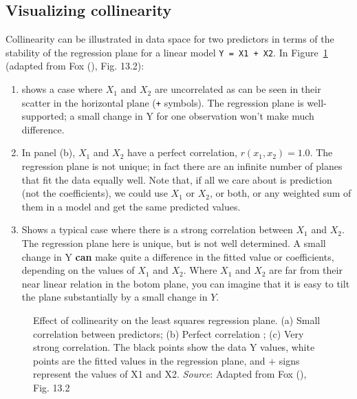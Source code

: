 \documentclass[
  letterpaper,
  10pt,
  krantz2]{krantz}
\begin{document}
\subsection{Visualizing collinearity}\label{visualizing-collinearity}

Collinearity can be illustrated in data space for two predictors in
terms of the stability of the regression plane for a linear model
\texttt{Y\ =\ X1\ +\ X2}. In Figure~\ref{fig-collin-demo} (adapted from
Fox (), Fig. 13.2):

\begin{enumerate}
\def\labelenumi{(\alph{enumi})}
\item
  shows a case where \(X_1\) and \(X_2\) are uncorrelated as can be seen
  in their scatter in the horizontal plane (\texttt{+} symbols). The
  regression plane is well-supported; a small change in Y for one
  observation won't make much difference.
\item
  In panel (b), \(X_1\) and \(X_2\) have a perfect correlation,
  \(r (x_1, x_2) = 1.0\). The regression plane is not unique; in fact
  there are an infinite number of planes that fit the data equally well.
  Note that, if all we care about is prediction (not the coefficients),
  we could use \(X_1\) or \(X_2\), or both, or any weighted sum of them
  in a model and get the same predicted values.
\item
  Shows a typical case where there is a strong correlation between
  \(X_1\) and \(X_2\). The regression plane here is unique, but is not
  well determined. A small change in Y \textbf{can} make quite a
  difference in the fitted value or coefficients, depending on the
  values of \(X_1\) and \(X_2\). Where \(X_1\) and \(X_2\) are far from
  their near linear relation in the botom plane, you can imagine that it
  is easy to tilt the plane substantially by a small change in \(Y\).
\end{enumerate}

\begin{figure}


\caption{\label{fig-collin-demo}Effect of collinearity on the least
squares regression plane. (a) Small correlation between predictors; (b)
Perfect correlation ; (c) Very strong correlation. The black points show
the data Y values, white points are the fitted values in the regression
plane, and + signs represent the values of X1 and X2. \emph{Source}:
Adapted from Fox (), Fig. 13.2}

\end{figure}%
\end{document}

